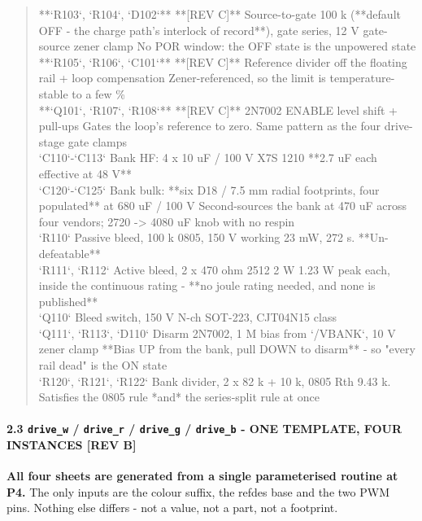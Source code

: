 \documentclass[11pt,a4paper]{article}
\begin{document}
\begin{quote}
\textbar{} {*}{*}`R103`, `R104`, `D102`{*}{*} \textbar{} {*}{*}{[}REV C{]}{*}{*} Source-to-gate 100 k ({*}{*}default OFF - the charge path's interlock of record{*}{*}), gate series, 12 V gate-source zener clamp \textbar{} No POR window: the OFF state is the unpowered state \textbar{}\\
\textbar{} {*}{*}`R105`, `R106`, `C101`{*}{*} \textbar{} {*}{*}{[}REV C{]}{*}{*} Reference divider off the floating rail + loop compensation \textbar{} Zener-referenced, so the limit is temperature-stable to a few \% \textbar{}\\
\textbar{} {*}{*}`Q101`, `R107`, `R108`{*}{*} \textbar{} {*}{*}{[}REV C{]}{*}{*} 2N7002 ENABLE level shift + pull-ups \textbar{} Gates the loop's reference to zero. Same pattern as the four drive-stage gate clamps \textbar{}\\
\textbar{} `C110`-`C113` \textbar{} Bank HF: 4 x 10 uF / 100 V X7S 1210 \textbar{} {*}{*}2.7 uF each effective at 48 V{*}{*} \textbar{}\\
\textbar{} `C120`-`C125` \textbar{} Bank bulk: {*}{*}six D18 / 7.5 mm radial footprints, four populated{*}{*} at 680 uF / 100 V \textbar{} Second-sources the bank at 470 uF across four vendors; 2720 -\textgreater{} 4080 uF knob with no respin \textbar{}\\
\textbar{} `R110` \textbar{} Passive bleed, 100 k 0805, 150 V working \textbar{} 23 mW, 272 s. {*}{*}Un-defeatable{*}{*} \textbar{}\\
\textbar{} `R111`, `R112` \textbar{} Active bleed, 2 x 470 ohm 2512 2 W \textbar{} 1.23 W peak each, inside the continuous rating - {*}{*}no joule rating needed, and none is published{*}{*} \textbar{}\\
\textbar{} `Q110` \textbar{} Bleed switch, 150 V N-ch SOT-223, CJT04N15 class \textbar{} \textbar{}\\
\textbar{} `Q111`, `R113`, `D110` \textbar{} Disarm 2N7002, 1 M bias from `/VBANK`, 10 V zener clamp \textbar{} {*}{*}Bias UP from the bank, pull DOWN to disarm{*}{*} - so "every rail dead" is the ON state \textbar{}\\
\textbar{} `R120`, `R121`, `R122` \textbar{} Bank divider, 2 x 82 k + 10 k, 0805 \textbar{} Rth 9.43 k. Satisfies the 0805 rule {*}and{*} the series-split rule at once \textbar{}
\end{quote}
\paragraph*{2.3 \texttt{drive\_w} / \texttt{drive\_r} / \texttt{drive\_g} / \texttt{drive\_b} - ONE TEMPLATE, FOUR INSTANCES  \textbf{{[}REV B{]}}}
\textbf{All four sheets are generated from a single parameterised routine at P4.} The only inputs are the colour suffix, the refdes base and the two PWM pins. Nothing else differs - not a value, not a part, not a footprint.
\end{document}
